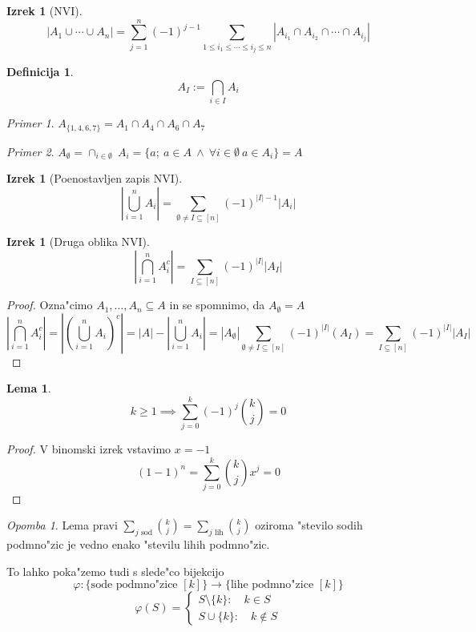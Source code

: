 \documentclass[a4paper,12pt]{article}
\theoremstyle{definition}
\newtheorem{defn}[counter]{Definicija}
\newtheorem{lemma}[counter]{Lema}
\newtheorem{theorem}[counter]{Izrek}
\theoremstyle{remark}
\newtheorem*{ex}{Primer}
\newtheorem*{rem}{Opomba}
\begin{document}
\begin{theorem}[NVI]
	\[|A_1 \cup \cdots \cup A_n| = \sum_{j = 1}^{n} (-1)^{j - 1} \sum_{1 \leqslant i_1 \leqslant \cdots \leqslant i_j \leqslant n}|A_{i_1} \cap A_{i_2} \cap \cdots \cap A_{i_j}|\]
\end{theorem}
\begin{defn}
	\[A_I := \displaystyle \bigcap_{i \in I} A_i \]
\end{defn}
\begin{ex}
	$A_{\{1,4,6,7\}} = A_1 \cap A_4 \cap A_6 \cap A_7$
\end{ex}
\begin{ex}
	$A_{\emptyset} = \cap_{i \in \emptyset} \ A_i = \{a; \ a \in A \ \land \ \forall i \in \emptyset\ a \in A_i \} = A$
\end{ex}
\begin{theorem}[Poenostavljen zapis NVI]
	\[|\bigcup_{i = 1}^{n} A_i| = \sum_{\emptyset \neq I \subseteq [n]} (-1)^{|I| - 1} |A_i|\]
\end{theorem}
\begin{theorem}[Druga oblika NVI]
	\[|\bigcap_{i = 1}^n A_i^c|  = \sum_{I \subseteq [n]} (-1)^{|I|} |A_I|\]
\end{theorem}
\begin{proof}
	Ozna"cimo $A_1, \ldots, A_n \subseteq A$ in se spomnimo, da $A_\emptyset = A$
	\[
		|\bigcap_{i = 1}^n A_i^c| =
		|(\bigcup_{i = 1}^n A_i)^c| =
		|A| - |\bigcup_{i = 1}^n A_i| = 
		|A_{\emptyset}|\sum_{\emptyset \neq I \subseteq [n]} (-1)^{|I|} (A_I) = 
		\sum_{I \subseteq [n]} (-1)^{|I|} |A_I|
	\]
\end{proof}


\begin{lemma}
\[k \geqslant 1 \implies \sum_{j = 0}^k (-1)^j \binom{k}{j} = 0\]
\end{lemma}

\begin{proof}
	V binomski izrek vstavimo $x = -1$
	\[(1 -1)^n = \sum_{j = 0}^k \binom{k}{j} x^j = 0\]
\end{proof}

\begin{rem}
	Lema pravi $\sum_{j \text{ sod}} \binom{k}{j} = \sum_{j\text{ lih}} \binom{k}{j}$ oziroma "stevilo sodih podmno"zic je vedno enako "stevilu lihih podmno"zic.
\end{rem}

To lahko poka"zemo tudi s slede"co bijekcijo
\[\varphi: \{\text{sode podmno"zice }[k]\} \rightarrow \{\text{lihe podmno"zice }[k]\} \]
\[\varphi (S) = \begin{cases}S \setminus \{k\}: \quad k \in S  \\ S \cup \{k\}: \quad k \notin S \end{cases}\]
\end{document}
